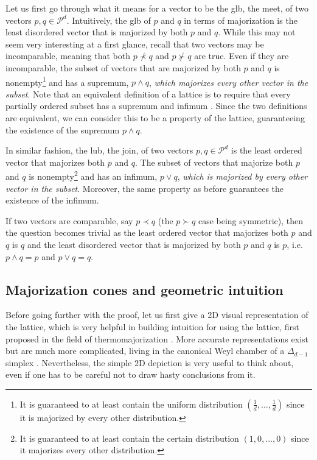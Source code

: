 Let us first go through what it means for a vector to be the glb, the meet, of two vectors $p, q \in \mathcal{P}^d$. Intuitively, the glb of $p$ and $q$ in terms of majorization is the least disordered vector that is majorized by both $p$ and $q$. While this may not seem very interesting at a first glance, recall that two vectors may be incomparable, meaning that both $p \nprec q$ and $p \nsucc q$ are true. Even if they are incomparable, the subset of vectors that are majorized by both $p$ and $q$ is nonempty\footnote{It is guaranteed to at least contain the uniform distribution $(\frac{1}{d}, ..., \frac{1}{d})$ since it is majorized by every other distribution.} and has a supremum, $p \wedge q$, \textit{which majorizes every other vector in the subset}. Note that an equivalent definition of a lattice is to require that every partially ordered subset has a supremum and infimum \cite[p. 19]{marshall_inequalities_2011}. Since the two definitions are equivalent, we can consider this to be a property of the lattice, guaranteeing the existence of the supremum $p \wedge q$.

In similar fashion, the lub, the join, of two vectors $p, q \in \mathcal{P}^d$ is the least ordered vector that majorizes both $p$ and $q$. The subset of vectors that majorize both $p$ and $q$ is nonempty\footnote{It is guaranteed to at least contain the certain distribution $(1, 0, ..., 0)$ since it majorizes every other distribution.} and has an infimum, $p \vee q$, \textit{which is majorized by every other vector in the subset}. Moreover, the same property as before guarantees the existence of the infimum.

\begin{corollary} \label{cor:comp_meet_join}
    If two vectors are comparable, say $p \prec q$ (the $p \succ q$ case being symmetric), then the question becomes trivial as the least ordered vector that majorizes both $p$ and $q$ is $q$ and the least disordered vector that is majorized by both $p$ and $q$ is $p$, i.e. $p \wedge q = p$ and $p \vee q = q$.
\end{corollary}



\subsection{Majorization cones and geometric intuition}

Before going further with the proof, let us first give a 2D visual representation of the lattice, which is very helpful in building intuition for using the lattice, first proposed in the field of thermomajorization \cite{korzekwa_structure_2017}. More accurate representations exist but are much more complicated, living in the canonical Weyl chamber of a $\Delta_{d-1}$ simplex \cite{junior_geometric_2022}. Nevertheless, the simple 2D depiction is very useful to think about, even if one has to be careful not to draw hasty conclusions from it.

